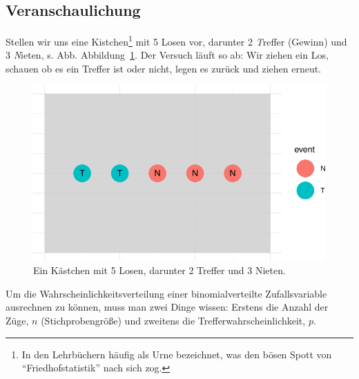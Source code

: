 \documentclass[
  a4paper,
  DIV=11]{scrreprt}
\theoremstyle{definition}
\theoremstyle{remark}
\begin{document}
\hypertarget{veranschaulichung}{%
\subsection{Veranschaulichung}\label{veranschaulichung}}

Stellen wir uns eine Kistchen\footnote{In den Lehrbüchern häufig als
  Urne bezeichnet, was den bösen Spott von ``Friedhofstatistik'' nach
  sich zog.} mit 5 Losen vor, darunter 2 \emph{T}reffer (Gewinn) und 3
\emph{N}ieten, s. Abb. Abbildung~\ref{fig-urne}. Der Versuch läuft so
ab: Wir ziehen ein Los, schauen ob es ein Treffer ist oder nicht, legen
es zurück und ziehen erneut.

\begin{figure}

{\centering \includegraphics{./Verteilungen_files/figure-pdf/fig-urne-1.pdf}

}

\caption{\label{fig-urne}Ein Kästchen mit 5 Losen, darunter 2 Treffer
und 3 Nieten.}

\end{figure}

\begin{tcolorbox}[enhanced jigsaw, title=\textcolor{quarto-callout-important-color}{\faExclamation}\hspace{0.5em}{Wichtig}, bottomtitle=1mm, bottomrule=.15mm, titlerule=0mm, colbacktitle=quarto-callout-important-color!10!white, colframe=quarto-callout-important-color-frame, leftrule=.75mm, left=2mm, toprule=.15mm, colback=white, arc=.35mm, breakable, toptitle=1mm, opacityback=0, rightrule=.15mm, coltitle=black, opacitybacktitle=0.6]

Um die Wahrscheinlichkeitsverteilung einer binomialverteilte
Zufallsvariable ausrechnen zu können, muss man zwei Dinge wissen:
Erstens die Anzahl der Züge, \(n\) (Stichprobengröße) und zweitens die
Trefferwahrscheinlichkeit, \(p\).

\end{tcolorbox}
\end{document}
